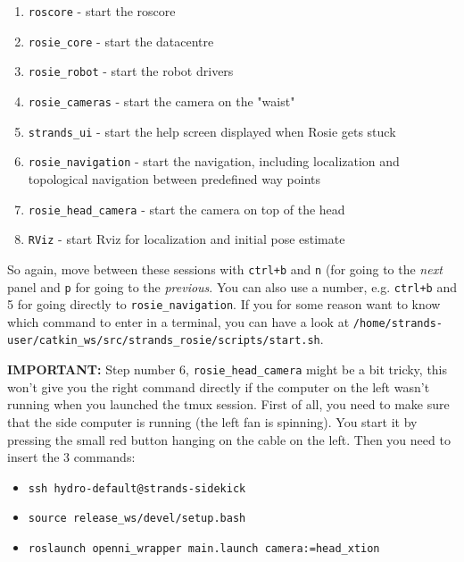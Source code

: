 \documentclass[a4paper,11pt]{article}
\begin{document}
\begin{enumerate}[start=0]
\item \texttt{roscore} - start the roscore

\item \texttt{rosie\_core} - start the datacentre

\item \texttt{rosie\_robot} - start the robot drivers

\item \texttt{rosie\_cameras} - start the camera on the "waist"

\item \texttt{strands\_ui} - start the help screen displayed when Rosie gets stuck

\item \texttt{rosie\_navigation} - start the navigation, including localization and topological navigation between predefined way points

\item \texttt{rosie\_head\_camera} - start the camera on top of the head

\item \texttt{RViz} - start Rviz for localization and initial pose estimate
\end{enumerate}

So again, move between these sessions with \texttt{ctrl+b} and \texttt{n} (for going to the \textit{next} panel and \texttt{p} for going to the \textit{previous}. You can also use a number, e.g. \texttt{ctrl+b} and 5 for going directly to \texttt{rosie\_navigation}. If you for some reason want to know which command
to enter in a terminal, you can have a look at \texttt{/home/strands-user/catkin\_ws/src/strands\_rosie/scripts/start.sh}.

\textbf{IMPORTANT:} Step number 6, \texttt{rosie\_head\_camera} might be a bit
tricky, this won't give you the right command directly if the computer on the left
wasn't running when you launched the tmux session. First of all, you need to
make sure that the side computer is running (the left fan is spinning).
You start it by pressing the small red button hanging on the cable on the left.
Then you need to insert the 3 commands:

\begin{itemize}
\item \texttt{ssh hydro-default@strands-sidekick}
\item \texttt{source release\_ws/devel/setup.bash}
\item \texttt{roslaunch openni\_wrapper main.launch camera:=head\_xtion}
\end{itemize}
\end{document}
